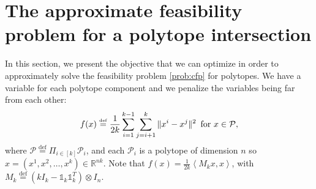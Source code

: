 \documentclass[twoside]{article}
\newcommand{\R}{\mathbb{R}}
\newcommand{\ones}{\mathbb{1}}
\newcommand\linktoproof[1]{{\normalfont[{\hyperlink{proof:#1}{$\downarrow$}}]}}
\newcommand{\mP}{\mathcal{P}}
\newcommand{\innp}[1]{\left\langle #1 \right\rangle}
\newcommand{\defi}{\stackrel{\mathrm{\scriptscriptstyle def}}{=}}
\newtheorem{theorem}{Theorem}[section]
\begin{document}

\section{The approximate feasibility problem for a polytope intersection}\label{s:polytope_intersection}


In this section, we present the objective that we can optimize in order to approximately solve the feasibility problem \eqref{prob:cfp} for polytopes. We have a variable for each polytope component and we penalize the variables being far from each other:
    \vspace{0.3cm}
\begin{equation}\label{prob:intersection_k}
    f(x) \defi \frac{1}{2k} \sum_{i=1}^{k-1} \sum_{j=i+1}^k \|x^i - x^j\|^2\, \text{ for } x \in \mP,
    \vspace{0.3cm}
\end{equation}
where $\mP \defi \Pi_{i \in [k]} \mP_i$, and each $\mP_i$ is a polytope of dimension $n$ so $x = (x^1, x^2, \ldots, x^k) \in \R^{nk}$.
Note that $f(x) = \frac{1}{2k} \innp{M_k x, x}$, with $M_k \defi (k I_{k} - \ones_{k} \ones_{k}^T) \otimes I_n$.

\end{document}
